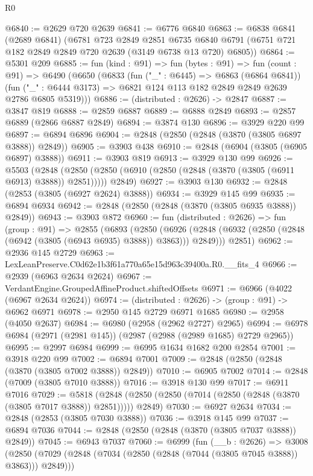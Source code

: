 \begin{lexlean}{R0}
\begin{coremodule}
@6840 := @2629 @720 @2639
@6841 := @6776 @6840
@6863 := @6838
    @6841
    (@2689 @6841)
    (@6781
      @723
      @2849
      @2851
      @6735
      @6840
      @6791
      (@6751 @721 @182 @2849 @2849 @720 @2639 (@3149 @6738 @13 @720) @6805))
@6864 := @5301 @209
@6885 := fun (kind : @91) =>
  fun (bytes : @91) =>
  fun (count : @91) =>
  @6490
    (@6650
      (@6833
        (fun ("_" : @6445) => @6863 (@6864 @6841))
        (fun ("_" : @6444 @3173) => @6821 @124 @113 @182 @2849 @2849 @2639 @2786 @6805 @5319)))
@6886 := (distributed : @2626) -> @2847
@6887 := @3847 @819
@6888 := @2859 @6887
@6889 := @6888 @2849
@6893 := @2857 @6889 (@2866 @6887 @2849)
@6894 := @3874 @130
@6896 := @3929 @220 @99
@6897 := @6894 @6896
@6904 := @2848 (@2850 (@2848 (@3870 (@3805 @6897 @3888)) @2849))
@6905 := @3903 @438
@6910 := @2848 (@6904 (@3805 (@6905 @6897) @3888))
@6911 := @3903 @819
@6913 := @3929 @130 @99
@6926 := @5503
    (@2848 (@2850 (@2850 (@6910 (@2850 (@2848 (@3870 (@3805 (@6911 @6913) @3888)) @2851))))) @2849)
@6927 := @3903 @130
@6932 := @2848 (@2853 (@3805 (@6927 @2624) @3888))
@6934 := @3929 @145 @99
@6935 := @6894 @6934
@6942 := @2848 (@2850 (@2848 (@3870 (@3805 @6935 @3888)) @2849))
@6943 := @3903 @872
@6960 := fun (distributed : @2626) =>
  fun (group : @91) =>
  @2855
    (@6893
      (@2850
        (@6926 (@2848 (@6932 (@2850 (@2848 (@6942 (@3805 (@6943 @6935) @3888)) @3863))) @2849)))
      @2851)
@6962 := @2936 @145 @2729
@6963 := LexLeanPreserve.C0d62e1b3f61a770a65e15d963c39400a.R0.__fits_4
@6966 := @2939 (@6963 @2634 @2624)
@6967 := VerdantEngine.GroupedAffineProduct.shiftedOffsets
@6971 := @6966 (@4022 (@6967 @2634 @2624))
@6974 := (distributed : @2626) -> (group : @91) -> @6962 @6971
@6978 := @2950 @145 @2729 @6971 @1685
@6980 := @2958 (@4050 @2637)
@6984 := @6980 (@2958 (@2962 @2727) @2965)
@6994 := @6978 @6984 (@2971 (@2981 @145)) (@2987 (@2988 (@2989 @1685) @2729 @2965))
@6995 := @2997 @6984
@6999 := @6995 @1634 @1682 @200 @2854
@7001 := @3918 @220 @99
@7002 := @6894 @7001
@7009 := @2848 (@2850 (@2848 (@3870 (@3805 @7002 @3888)) @2849))
@7010 := @6905 @7002
@7014 := @2848 (@7009 (@3805 @7010 @3888))
@7016 := @3918 @130 @99
@7017 := @6911 @7016
@7029 := @5818
    (@2848 (@2850 (@2850 (@7014 (@2850 (@2848 (@3870 (@3805 @7017 @3888)) @2851))))) @2849)
@7030 := @6927 @2634
@7034 := @2848 (@2853 (@3805 @7030 @3888))
@7036 := @3918 @145 @99
@7037 := @6894 @7036
@7044 := @2848 (@2850 (@2848 (@3870 (@3805 @7037 @3888)) @2849))
@7045 := @6943 @7037
@7060 := @6999
    (fun (__b : @2626) =>
    @3008
      (@2850 (@7029 (@2848 (@7034 (@2850 (@2848 (@7044 (@3805 @7045 @3888)) @3863))) @2849)))

\end{coremodule}
\end{lexlean}
